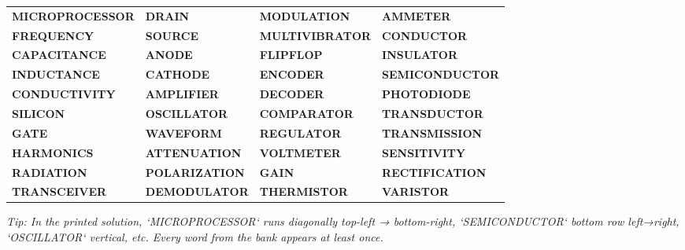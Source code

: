 \begin{tcolorbox}[
  colback=white,
  colframe=IEEEblue!70!black,
  boxrule=0.5pt,
  arc=0mm,
  left=4mm, right=4mm, top=1.5mm, bottom=1.5mm
]
\medskip
\scriptsize\rmfamily
\setlength{\tabcolsep}{4pt}
\renewcommand{\arraystretch}{1.05}
\begin{tabular}{@{}llll@{}}
  \textcolor{IEEEblue}{\textbf{MICROPROCESSOR}} & \textcolor{IEEEblue}{\textbf{DRAIN}} & \textcolor{IEEEblue}{\textbf{MODULATION}} & \textcolor{IEEEblue}{\textbf{AMMETER}} \\
  \textcolor{IEEEblue}{\textbf{FREQUENCY}} & \textcolor{IEEEblue}{\textbf{SOURCE}} & \textcolor{IEEEblue}{\textbf{MULTIVIBRATOR}} & \textcolor{IEEEblue}{\textbf{CONDUCTOR}} \\
  \textcolor{IEEEblue}{\textbf{CAPACITANCE}} & \textcolor{IEEEblue}{\textbf{ANODE}} & \textcolor{IEEEblue}{\textbf{FLIPFLOP}} & \textcolor{IEEEblue}{\textbf{INSULATOR}} \\
  \textcolor{IEEEblue}{\textbf{INDUCTANCE}} & \textcolor{IEEEblue}{\textbf{CATHODE}} & \textcolor{IEEEblue}{\textbf{ENCODER}} & \textcolor{IEEEblue}{\textbf{SEMICONDUCTOR}} \\
  \textcolor{IEEEblue}{\textbf{CONDUCTIVITY}} & \textcolor{IEEEblue}{\textbf{AMPLIFIER}} & \textcolor{IEEEblue}{\textbf{DECODER}} & \textcolor{IEEEblue}{\textbf{PHOTODIODE}} \\
  \textcolor{IEEEblue}{\textbf{SILICON}} & \textcolor{IEEEblue}{\textbf{OSCILLATOR}} & \textcolor{IEEEblue}{\textbf{COMPARATOR}} & \textcolor{IEEEblue}{\textbf{TRANSDUCTOR}} \\
  \textcolor{IEEEblue}{\textbf{GATE}} & \textcolor{IEEEblue}{\textbf{WAVEFORM}} & \textcolor{IEEEblue}{\textbf{REGULATOR}} & \textcolor{IEEEblue}{\textbf{TRANSMISSION}} \\
  \textcolor{IEEEblue}{\textbf{HARMONICS}} & \textcolor{IEEEblue}{\textbf{ATTENUATION}} & \textcolor{IEEEblue}{\textbf{VOLTMETER}} & \textcolor{IEEEblue}{\textbf{SENSITIVITY}} \\
  \textcolor{IEEEblue}{\textbf{RADIATION}} & \textcolor{IEEEblue}{\textbf{POLARIZATION}} & \textcolor{IEEEblue}{\textbf{GAIN}} & \textcolor{IEEEblue}{\textbf{RECTIFICATION}} \\
  \textcolor{IEEEblue}{\textbf{TRANSCEIVER}} & \textcolor{IEEEblue}{\textbf{DEMODULATOR}} & \textcolor{IEEEblue}{\textbf{THERMISTOR}} & \textcolor{IEEEblue}{\textbf{VARISTOR}} \\
\end{tabular}

\smallskip
\footnotesize\itshape Tip: In the printed solution, `MICROPROCESSOR` runs diagonally top-left → bottom-right, `SEMICONDUCTOR` bottom row left→right, `OSCILLATOR` vertical, etc. Every word from the bank appears at least once.
\end{tcolorbox}

